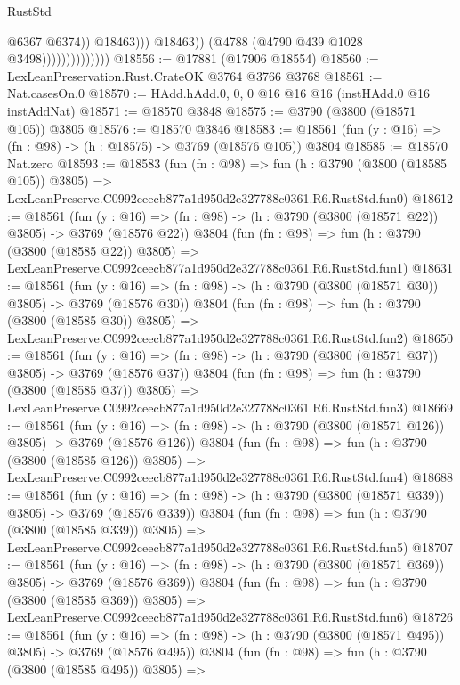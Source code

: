 \begin{lexlean}{RustStd}
\begin{coremodule}
                                          @6367
                                          @6374))
                                      @18463)))
                                @18463))
                            (@4788 (@4790 @439 @1028 @3498))))))))))))))
@18556 := @17881 (@17906 @18554)
@18560 := LexLeanPreservation.Rust.CrateOK @3764 @3766 @3768
@18561 := Nat.casesOn.{0}
@18570 := HAdd.hAdd.{0, 0, 0} @16 @16 @16 (instHAdd.{0} @16 instAddNat)
@18571 := @18570 @3848
@18575 := @3790 (@3800 (@18571 @105)) @3805
@18576 := @18570 @3846
@18583 := @18561 (fun (y : @16) => (fn : @98) -> (h : @18575) -> @3769 (@18576 @105)) @3804
@18585 := @18570 Nat.zero
@18593 := @18583
    (fun (fn : @98) =>
    fun (h : @3790 (@3800 (@18585 @105)) @3805) =>
    LexLeanPreserve.C0992ceecb877a1d950d2e327788c0361.R6.RustStd.fun0)
@18612 := @18561
    (fun (y : @16) => (fn : @98) -> (h : @3790 (@3800 (@18571 @22)) @3805) -> @3769 (@18576 @22))
    @3804
    (fun (fn : @98) =>
    fun (h : @3790 (@3800 (@18585 @22)) @3805) =>
    LexLeanPreserve.C0992ceecb877a1d950d2e327788c0361.R6.RustStd.fun1)
@18631 := @18561
    (fun (y : @16) => (fn : @98) -> (h : @3790 (@3800 (@18571 @30)) @3805) -> @3769 (@18576 @30))
    @3804
    (fun (fn : @98) =>
    fun (h : @3790 (@3800 (@18585 @30)) @3805) =>
    LexLeanPreserve.C0992ceecb877a1d950d2e327788c0361.R6.RustStd.fun2)
@18650 := @18561
    (fun (y : @16) => (fn : @98) -> (h : @3790 (@3800 (@18571 @37)) @3805) -> @3769 (@18576 @37))
    @3804
    (fun (fn : @98) =>
    fun (h : @3790 (@3800 (@18585 @37)) @3805) =>
    LexLeanPreserve.C0992ceecb877a1d950d2e327788c0361.R6.RustStd.fun3)
@18669 := @18561
    (fun (y : @16) => (fn : @98) -> (h : @3790 (@3800 (@18571 @126)) @3805) -> @3769 (@18576 @126))
    @3804
    (fun (fn : @98) =>
    fun (h : @3790 (@3800 (@18585 @126)) @3805) =>
    LexLeanPreserve.C0992ceecb877a1d950d2e327788c0361.R6.RustStd.fun4)
@18688 := @18561
    (fun (y : @16) => (fn : @98) -> (h : @3790 (@3800 (@18571 @339)) @3805) -> @3769 (@18576 @339))
    @3804
    (fun (fn : @98) =>
    fun (h : @3790 (@3800 (@18585 @339)) @3805) =>
    LexLeanPreserve.C0992ceecb877a1d950d2e327788c0361.R6.RustStd.fun5)
@18707 := @18561
    (fun (y : @16) => (fn : @98) -> (h : @3790 (@3800 (@18571 @369)) @3805) -> @3769 (@18576 @369))
    @3804
    (fun (fn : @98) =>
    fun (h : @3790 (@3800 (@18585 @369)) @3805) =>
    LexLeanPreserve.C0992ceecb877a1d950d2e327788c0361.R6.RustStd.fun6)
@18726 := @18561
    (fun (y : @16) => (fn : @98) -> (h : @3790 (@3800 (@18571 @495)) @3805) -> @3769 (@18576 @495))
    @3804
    (fun (fn : @98) =>
    fun (h : @3790 (@3800 (@18585 @495)) @3805) =>

\end{coremodule}
\end{lexlean}
